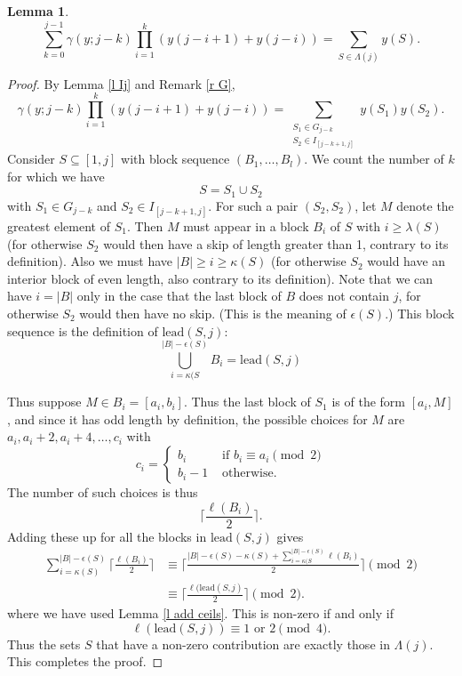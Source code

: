 \documentclass[11pt, oneside]{article}   	%
\newtheorem{lemma}{Lemma}
\begin{document}
\begin{lemma}  \label{l 1Lambda}
\[
\sum_{k=0}^{j-1} \gamma(y;j-k) \prod_{i=1}^k (y(j-i+1)+y(j-i))  = \sum_{S \in \Lambda(j)} y(S).  
\]
\end{lemma} 
\begin{proof}
By Lemma \ref{l Ij} and Remark \ref{r G},
 \[
 \gamma(y;j-k) \prod_{i=1}^k (y(j-i+1)+y(j-i)) = \sum_{\substack{S_1 \in G_{j-k}\\ S_2 \in I_{[j-k+1,j]}}} y(S_1)y(S_2).
 \]
 Consider $S \subseteq[1,j]$ with block sequence $(B_1, \ldots, B_l)$. We count the number of $k$ for which we have 
 \[
 S = S_1 \cup S_2
 \] 
 with $S_1 \in G_{j-k}$ and $S_2 \in I_{[j-k+1,j]}$. For such a pair $(S_2, S_2)$, let $M$ denote the greatest element of $S_1$. Then $M$ must appear in a block $B_i$ of $S$ with $i \geq \lambda(S)$ (for otherwise $S_2$ would then have a skip of length greater than 1, contrary to its definition). Also we must have $ |B| \geq i \geq \kappa(S)$ (for otherwise $S_2$ would have an interior block of even length, also contrary to its definition). Note that we can have $i=|B|$ only in the case that the last block of $B$ does not contain $j$, for otherwise  $S_2$ would then have no skip. (This is the meaning of $\epsilon(S)$.) This block sequence is the definition of $\mathrm{lead}(S,j)$:
 \[
  \bigcup_{i=\kappa(S}^{|B| - \epsilon(S)}B_i= \mathrm{lead}(S,j)
 \]
  
 Thus suppose $M \in B_i = [a_i, b_i]$. Thus the last block of $S_1$ is of the form $[a_i, M]$, and since it has odd length by definition, the possible choices for $M$ are $a_i, a_i+2, a_i+4, \ldots, c_i$ with 
 \[
 c_i = \begin{cases} 
 b_i &\text{ if } b_i \equiv a_i \pmod 2 \\ 
 b_i -1 &\text{ otherwise}. 
 \end{cases} 
 \]    
 The number of such choices is thus
 \[
 \lceil \frac{\ell(B_i)}{2} \rceil.
 \]
 Adding these up for all the blocks in $\mathrm{lead}(S,j)$ gives
 \begin{align*}
\sum_{i=\kappa(S)}^{|B| - \epsilon(S)}  \lceil \frac{\ell(B_i)}{2} \rceil  &\equiv  \lceil  \frac{|B| - \epsilon(S)-\kappa(S)+\sum_{i=\kappa(S}^{|B| - \epsilon(S)} \ell(B_i)}{2}\rceil \pmod 2\\
&\equiv   \lceil \frac{\ell(\mathrm{lead}(S,j)}{2} \rceil \pmod 2. 
 \end{align*}
 where we have used Lemma \ref{l add ceils}. This is non-zero if and only if 
 \[
 \ell(\mathrm{lead}(S,j)) \equiv 1\text{ or } 2 \pmod 4.
 \]
 Thus the sets $S$ that have a non-zero contribution are exactly those in $\Lambda(j)$. This completes the proof. 
\end{proof}
\end{document}
